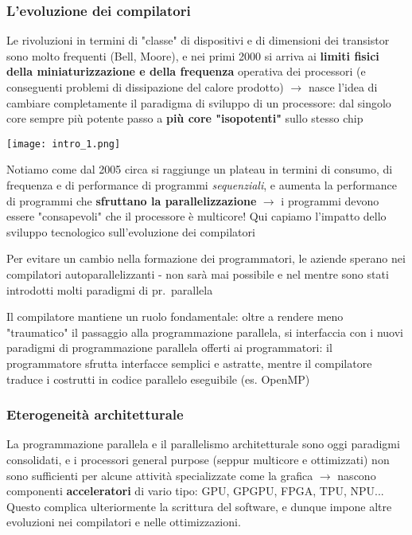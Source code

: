 \subsubsection{L'evoluzione dei compilatori}

Le rivoluzioni in termini di "classe" di dispositivi e di dimensioni dei transistor sono molto frequenti (Bell, Moore), e nei primi 2000 si arriva ai \textbf{limiti fisici della miniaturizzazione e della frequenza} operativa dei processori (e conseguenti problemi di dissipazione del calore prodotto) $\rightarrow$ nasce l'idea di cambiare completamente il paradigma di sviluppo di un processore: dal singolo core sempre pi\`u potente passo a \textbf{pi\`u core "isopotenti"} sullo stesso chip

\noindent\begin{minipage}[c]{.3\textwidth}
\texttt{[image: intro\_1.png]}
\end{minipage}
\begin{minipage}[c]{.7\textwidth}
  Notiamo come dal 2005 circa si raggiunge un plateau in termini di consumo, di frequenza e di performance di programmi \textit{sequenziali}, e aumenta la performance di programmi che \textbf{sfruttano la parallelizzazione} $\rightarrow$ i programmi devono essere "consapevoli" che il processore \`e multicore! Qui capiamo l'impatto dello sviluppo tecnologico sull'evoluzione dei compilatori
\end{minipage}

\begin{emphasize}
  Per evitare un cambio nella formazione dei programmatori, le aziende sperano nei compilatori autoparallelizzanti - non sar\`a mai possibile e nel mentre sono stati introdotti molti paradigmi di pr.~parallela
\end{emphasize}

Il compilatore mantiene un ruolo fondamentale: oltre a rendere meno "traumatico" il passaggio alla programmazione parallela, si interfaccia con i nuovi paradigmi di programmazione parallela offerti ai programmatori: il programmatore sfrutta interfacce semplici e astratte, mentre il compilatore traduce i costrutti in codice parallelo eseguibile (es. OpenMP)

\subsubsection{Eterogeneit\`a architetturale}

La programmazione parallela e il parallelismo architetturale sono oggi paradigmi consolidati, e i processori general purpose (seppur multicore e ottimizzati) non sono sufficienti per alcune attivit\`a specializzate come la grafica $\rightarrow$ nascono componenti \textbf{acceleratori} di vario tipo: GPU, GPGPU, FPGA, TPU, NPU...
Questo complica ulteriormente la scrittura del software, e dunque impone altre evoluzioni nei compilatori e nelle ottimizzazioni.

